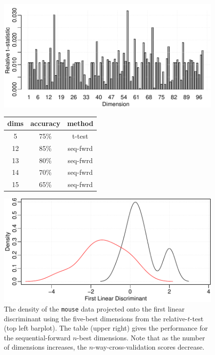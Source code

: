 \begin{figure}[H]
  \begin{minipage}[b]{0.65\linewidth}
    \hspace{5mm}
    \includegraphics[width=\linewidth]{images/mouse_ttest.pdf}
  \vspace{10mm}
  \end{minipage}
  \hfill
  \quad
  \begin{minipage}[b]{0.45\linewidth}
    \centering
    \begin{tabular}[b]{c|c|c}
      \textbf{dims} & \textbf{accuracy} & \textbf{method} \\
      \hline
      5   & 75\% & t-test \\
      12  & 85\% & seq-fwrd\\
      13  & 80\% & seq-fwrd\\
      14  & 70\% & seq-fwrd\\
      15  & 65\% & seq-fwrd\\
    \end{tabular}
    \vspace{20mm}
  \end{minipage}
  \hfill
  \vspace{10mm}
  \quad
  \begin{minipage}[t]{1.00\linewidth}
    \includegraphics[width=\linewidth]{images/mouse.pdf}
  \end{minipage}
  \caption{The density of the \texttt{mouse} data projected onto the first linear discriminant using the five-best dimensions from the relative-$t$-test (top left barplot).  The table (upper right) gives the performance for the sequential-forward $n$-best dimensions.  Note that as the number of dimensions increases, the $n$-way-cross-validation scores decrease.} 
\end{figure}

